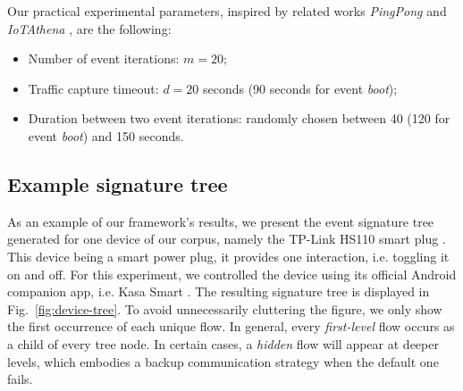 Our practical experimental parameters, inspired by related works \emph{PingPong} \cite{ping-pong} and \emph{IoTAthena} \cite{wan_iotathena_2022}, are the following:
\begin{itemize}
  \item Number of event iterations: $m = 20$;
  \item Traffic capture timeout: $d = 20$ seconds (90 seconds for event \emph{boot});
  \item Duration between two event iterations: randomly chosen between 40 (120 for event \emph{boot}) and 150 seconds.
\end{itemize}


\subsection{Example signature tree}

As an example of our framework's results,
we present the event signature tree
generated for one device of our corpus,
namely the TP-Link HS110 smart plug \cite{hs110}.
This device being a smart power plug,
it provides one interaction, i.e. toggling it on and off.
For this experiment, we controlled the device using its official Android companion app,
i.e. Kasa Smart \cite{app-kasa}. The resulting signature tree
is displayed in Fig.~\ref{fig:device-tree}.
To avoid unnecessarily cluttering the figure,
we only show the first occurrence of each unique flow.
In general, every \emph{first-level} flow occurs as a child of every tree node.
In certain cases, a \emph{hidden} flow will appear at deeper levels,
which embodies a backup communication strategy
when the default one fails.



